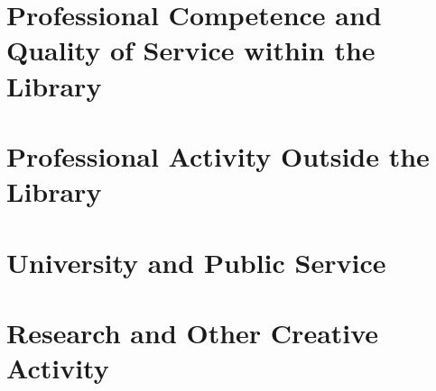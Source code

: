 \documentclass[12pt, oneside]{article}
\title{}
\author{Tim Dennis \\ Data Summary}
\date{January 2020 -- December 2022}
\begin{document}
\maketitle

\thispagestyle{fancy}



\section{Professional Competence and Quality of Service within the Library}




\section{Professional Activity Outside the Library}



\section{University and Public Service}



\section{Research and Other Creative Activity}


\end{document}
